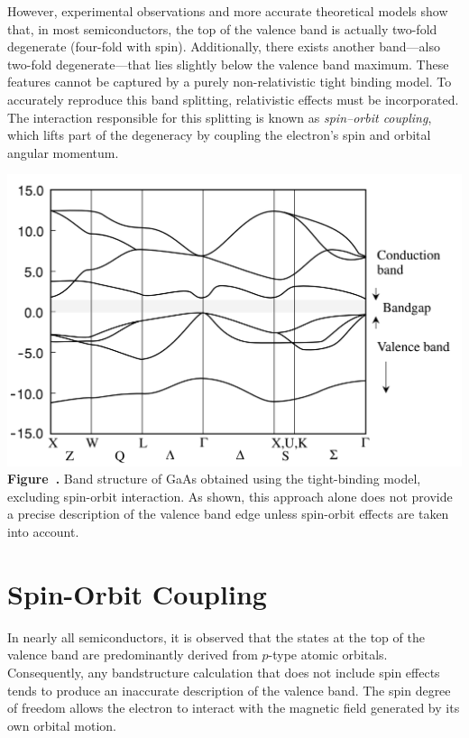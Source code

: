However, experimental observations and more accurate theoretical models show that, in most semiconductors, the top of the valence band is actually two-fold degenerate (four-fold with spin). Additionally, there exists another band—also two-fold degenerate—that lies slightly below the valence band maximum.
These features cannot be captured by a purely non-relativistic tight binding model. To accurately reproduce this band splitting, relativistic effects must be incorporated. The interaction responsible for this splitting is known as \textit{spin–orbit coupling}, which lifts part of the degeneracy by coupling the electron's spin and orbital angular momentum.

\begin{center}
	\begin{minipage}{0.6\textwidth}
		\centering
		\includegraphics[width=\textwidth]{img/GaAs_TBM.png}
		\\[0.5em]
		\textbf{Figure~\thefigure.} Band structure of GaAs obtained using the tight-binding model, excluding spin-orbit interaction. As shown, this approach alone does not provide a precise description of the valence band edge unless spin-orbit effects are taken into account.
		\label{fig:GaAs_TBM}
	\end{minipage}
\end{center}

\section{Spin-Orbit Coupling}
In nearly all semiconductors, it is observed that the states at the top of the valence band are predominantly derived from \( p \)-type atomic orbitals. Consequently, any bandstructure calculation that does not include spin effects tends to produce an inaccurate description of the valence band. The spin degree of freedom allows the electron to interact with the magnetic field generated by its own orbital motion.

